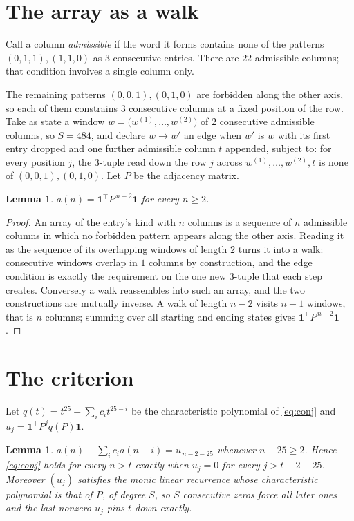 \documentclass[11pt,a4paper]{article}
\theoremstyle{plain}
\newtheorem{lemma}[theorem]{Lemma}
\theoremstyle{definition}
\begin{document}
\section{The array as a walk}

Call a column \emph{admissible} if the word it forms contains none of the patterns
$(0,1,1), (1,1,0)$ as $3$ consecutive entries. There are $22$ admissible columns; that condition
involves a single column only.

The remaining patterns $(0,0,1), (0,1,0)$ are forbidden along the other axis, so each of them
constrains $3$ consecutive columns at a fixed position of the row. Take as state a
window $w=\bigl(w^{(1)},\dots,w^{(2)}\bigr)$ of $2$ consecutive admissible
columns, so $S=484$, and declare $w\to w'$ an edge when $w'$ is $w$ with its first entry
dropped and one further admissible column $t$ appended, subject to: for every position
$j$, the $3$-tuple read down the row $j$ across $w^{(1)},\dots,w^{(2)},t$
is none of $(0,0,1), (0,1,0)$. Let $P$ be the adjacency matrix.

\begin{lemma}\label{lem:walk}
$a(n)=\mathbf{1}^{\!\top}P^{\,n-2}\mathbf{1}$ for every $n\ge2$.
\end{lemma}

\begin{proof}
An array of the entry's kind with $n$ columns is a sequence of $n$ admissible columns in
which no forbidden pattern appears along the other axis. Reading it as the sequence of its
overlapping windows of length $2$ turns it into a walk: consecutive windows overlap in
$1$ columns by construction, and the edge condition is exactly the requirement on the one
new $3$-tuple that each step creates. Conversely a walk reassembles into such an array,
and the two constructions are mutually inverse. A walk of length $n-2$ visits $n-1$
windows, that is $n$ columns; summing over all starting and ending states gives
$\mathbf{1}^{\!\top}P^{\,n-2}\mathbf{1}$.
\end{proof}

\section{The criterion}

Let $q(t)=t^{25}-\sum_i c_i t^{25-i}$ be the characteristic polynomial of
\eqref{eq:conj} and $u_j=\mathbf{1}^{\!\top}P^{j}q(P)\mathbf{1}$.

\begin{lemma}\label{lem:crit}
$a(n)-\sum_i c_i a(n-i)=u_{\,n-2-25}$ whenever $n-25\ge2$. Hence
\eqref{eq:conj} holds for every $n>t$ exactly when $u_j=0$ for every
$j>t-2-25$. Moreover $(u_j)$ satisfies the monic linear recurrence whose
characteristic polynomial is that of $P$, of degree $S$, so $S$ consecutive zeros force all
later ones and the last nonzero $u_j$ pins $t$ down exactly.
\end{lemma}
\end{document}
